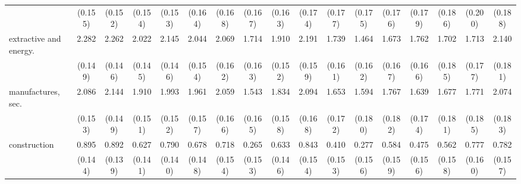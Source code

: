 {\begin{tabular}{l*{16}{c}}
                    &     (0.155)         &     (0.152)         &     (0.154)         &     (0.153)         &     (0.164)         &     (0.168)         &     (0.167)         &     (0.163)         &     (0.174)         &     (0.177)         &     (0.175)         &     (0.176)         &     (0.179)         &     (0.186)         &     (0.200)         &     (0.188)         \\
[1em]
extractive and energy.&       2.282\sym{***}&       2.262\sym{***}&       2.022\sym{***}&       2.145\sym{***}&       2.044\sym{***}&       2.069\sym{***}&       1.714\sym{***}&       1.910\sym{***}&       2.191\sym{***}&       1.739\sym{***}&       1.464\sym{***}&       1.673\sym{***}&       1.762\sym{***}&       1.702\sym{***}&       1.713\sym{***}&       2.140\sym{***}\\
                    &     (0.149)         &     (0.146)         &     (0.145)         &     (0.146)         &     (0.154)         &     (0.162)         &     (0.163)         &     (0.152)         &     (0.159)         &     (0.161)         &     (0.162)         &     (0.167)         &     (0.166)         &     (0.185)         &     (0.177)         &     (0.181)         \\
[1em]
manufactures, sec.  &       2.086\sym{***}&       2.144\sym{***}&       1.910\sym{***}&       1.993\sym{***}&       1.961\sym{***}&       2.059\sym{***}&       1.543\sym{***}&       1.834\sym{***}&       2.094\sym{***}&       1.653\sym{***}&       1.594\sym{***}&       1.767\sym{***}&       1.639\sym{***}&       1.677\sym{***}&       1.771\sym{***}&       2.074\sym{***}\\
                    &     (0.153)         &     (0.149)         &     (0.151)         &     (0.152)         &     (0.157)         &     (0.166)         &     (0.165)         &     (0.158)         &     (0.168)         &     (0.172)         &     (0.180)         &     (0.182)         &     (0.174)         &     (0.181)         &     (0.185)         &     (0.183)         \\
[1em]
construction        &       0.895\sym{***}&       0.892\sym{***}&       0.627\sym{***}&       0.790\sym{***}&       0.678\sym{***}&       0.718\sym{***}&       0.265         &       0.633\sym{***}&       0.843\sym{***}&       0.410\sym{**} &       0.277         &       0.584\sym{***}&       0.475\sym{**} &       0.562\sym{***}&       0.777\sym{***}&       0.782\sym{***}\\
                    &     (0.144)         &     (0.139)         &     (0.141)         &     (0.140)         &     (0.148)         &     (0.154)         &     (0.153)         &     (0.146)         &     (0.154)         &     (0.153)         &     (0.156)         &     (0.159)         &     (0.156)         &     (0.158)         &     (0.160)         &     (0.157)         \\

\end{tabular}}
